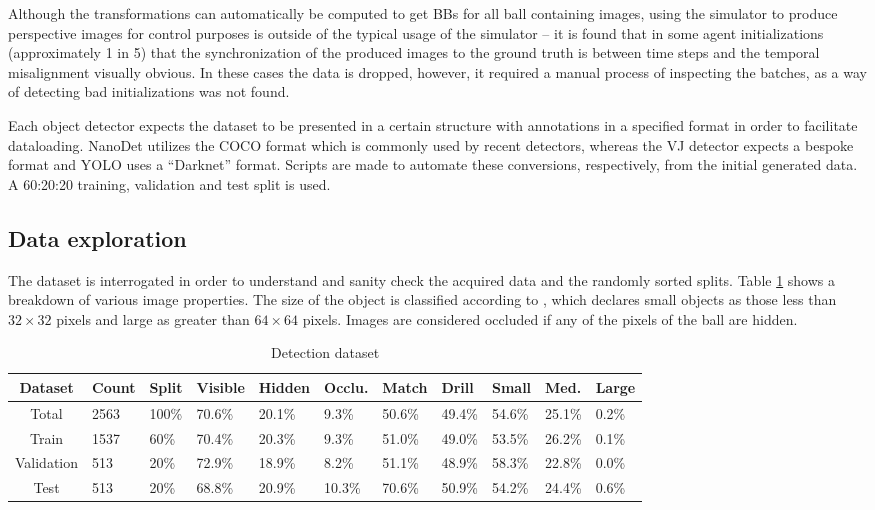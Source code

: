 \documentclass[a4paper,twoside,12pt]{report}
\begin{document}
Although the transformations can automatically be computed to get BBs for all ball containing images, using the simulator to produce perspective images for control purposes is outside of the typical usage of the simulator -- it is found that in some agent initializations (approximately 1 in 5) that the synchronization of the produced images to the ground truth is between time steps and the temporal misalignment visually obvious. In these cases the data is dropped, however, it required a manual process of inspecting the batches, as a way of detecting bad initializations was not found.

Each object detector expects the dataset to be presented in a certain structure with annotations in a specified format in order to facilitate dataloading. NanoDet utilizes the COCO format \citep{cocodataset} which is commonly used by recent detectors, whereas the VJ detector expects a bespoke format \citep{vjdataset} and YOLO uses a ``Darknet'' format. Scripts are made to automate these conversions, respectively, from the initial generated data. A 60:20:20 training, validation and test split is used.

\subsection{Data exploration}
The dataset is interrogated in order to understand and sanity check the acquired data and the randomly sorted splits. Table \ref{tab:detection} shows a breakdown of various image properties. The size of the object is classified according to \cite{cocoeval}, which declares small objects as those less than $32\times32$ pixels and large as greater than $64\times64$ pixels. Images are considered occluded if any of the pixels of the ball are hidden.

\begin{table}[h!]
\fontsize{9.5pt}{12pt}\selectfont
\centering
\begin{tabular}{c|ll|lll|ll|lll}
{\bf Dataset}	&{\bf Count}	&{\bf Split}	&{\bf Visible}	&{\bf Hidden}	&{\bf Occlu.}	&{\bf Match}	&{\bf Drill}	&{\bf Small}	&{\bf Med.}	&{\bf Large}	\\\hline
Total			&2563			&100\%			&70.6\%			&20.1\%			&9.3\%			&50.6\%			&49.4\%			&54.6\%			&25.1\%			&0.2\%			\\\hline   
Train			&1537			&60\%			&70.4\%			&20.3\%			&9.3\%			&51.0\%			&49.0\%			&53.5\%			&26.2\%			&0.1\%			\\\hline  
Validation		&513			&20\%			&72.9\%			&18.9\%			&8.2\%			&51.1\%			&48.9\%			&58.3\%			&22.8\%			&0.0\%			\\\hline  
Test			&513			&20\%			&68.8\%			&20.9\%			&10.3\%			&70.6\%			&50.9\%			&54.2\%			&24.4\%			&0.6\%			\\\hline                        
\end{tabular}
\caption{Detection dataset}
\label{tab:detection}
\end{table}
\end{document}
